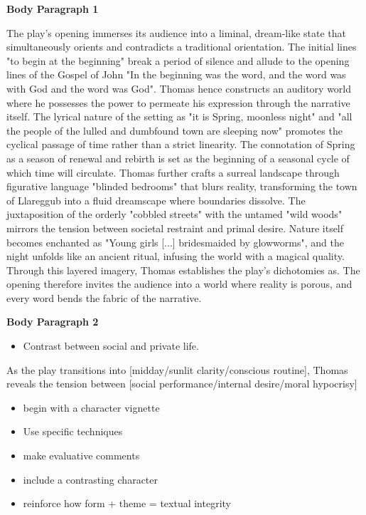 	\textbf{Body Paragraph 1}

	The play's opening immerses its audience into a liminal, dream-like state that simultaneously orients and contradicts a traditional orientation. The initial lines "to begin at the beginning" break a period of silence and allude to the opening lines of the Gospel of John "In the beginning was the word, and the word was with God and the word was God". Thomas hence constructs an auditory world where he possesses the power to permeate his expression through the narrative itself. The lyrical nature of the setting as "it is Spring, moonless night" and "all the people of the lulled and dumbfound town are sleeping now" promotes the cyclical passage of time rather than a strict linearity. The connotation of Spring as a season of renewal and rebirth is set as the beginning of a seasonal cycle of which time will circulate. Thomas further crafts a surreal landscape through figurative language "blinded bedrooms" that blurs reality, transforming the town of Llareggub into a fluid dreamscape where boundaries dissolve. The juxtaposition of the orderly "cobbled streets" with the untamed "wild woods" mirrors the tension between societal restraint and primal desire. Nature itself becomes enchanted as "Young girls [...] bridesmaided by glowworms", and the night unfolds like an ancient ritual, infusing the world with a magical quality. Through this layered imagery, Thomas establishes the play’s dichotomies as. The opening therefore invites the audience into a world where reality is porous, and every word bends the fabric of the narrative.

	\textbf{Body Paragraph 2}
	
		\begin{itemize}
			\item Contrast between social and private life.
		\end{itemize}

		As the play transitions into [midday/sunlit clarity/conscious routine], Thomas reveals the tension between [social performance/internal desire/moral hypocrisy]

		\begin{itemize}
			\item begin with a character vignette
			\item Use specific techniques
			\item make evaluative comments
			\item include a contrasting character
			\item reinforce how form + theme = textual integrity
		\end{itemize}

